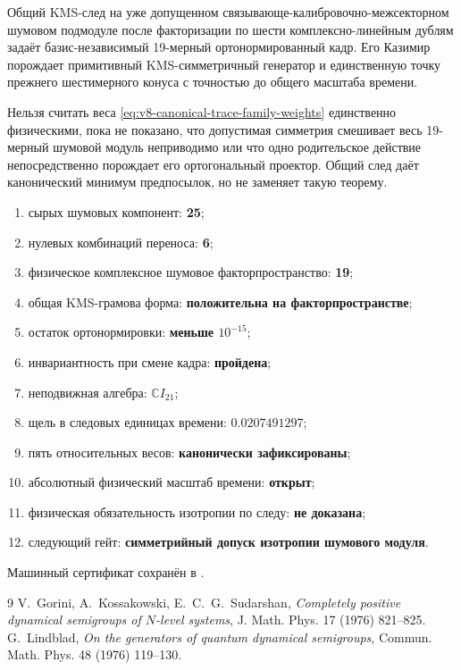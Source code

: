 \begin{theorem}
Общий KMS-след на уже допущенном связывающе-калибровочно-межсекторном шумовом подмодуле
после факторизации по шести комплексно-линейным дублям задаёт
базис-независимый 19-мерный ортонормированный кадр. Его Казимир порождает
примитивный KMS-симметричный генератор и единственную точку прежнего
шестимерного конуса с точностью до общего масштаба времени.
\end{theorem}

\begin{nogocriterion}
Нельзя считать веса \eqref{eq:v8-canonical-trace-family-weights}
единственно физическими, пока не показано, что допустимая симметрия смешивает
весь 19-мерный шумовой модуль неприводимо или что одно родительское действие
непосредственно порождает его ортогональный проектор. Общий след даёт
канонический минимум предпосылок, но не заменяет такую теорему.
\end{nogocriterion}

\begin{protocol}
\begin{enumerate}
 \item сырых шумовых компонент: \textbf{25};
 \item нулевых комбинаций переноса: \textbf{6};
 \item физическое комплексное шумовое факторпространство: \textbf{19};
 \item общая KMS-грамова форма: \textbf{положительна на факторпространстве};
 \item остаток ортонормировки: \textbf{меньше $10^{-15}$};
 \item инвариантность при смене кадра: \textbf{пройдена};
 \item неподвижная алгебра: \textbf{$\mathbb C I_{21}$};
 \item щель в следовых единицах времени: \textbf{$0.0207491297$};
 \item пять относительных весов: \textbf{канонически зафиксированы};
 \item абсолютный физический масштаб времени: \textbf{открыт};
 \item физическая обязательность изотропии по следу: \textbf{не доказана};
 \item следующий гейт: \textbf{симметрийный допуск изотропии шумового модуля}.
\end{enumerate}
\end{protocol}

Машинный сертификат сохранён в
.

\begin{thebibliography}{9}
V.~Gorini, A.~Kossakowski, E.~C.~G.~Sudarshan,
\emph{Completely positive dynamical semigroups of $N$-level systems},
J. Math. Phys. 17 (1976) 821--825.
G.~Lindblad,
\emph{On the generators of quantum dynamical semigroups},
Commun. Math. Phys. 48 (1976) 119--130.
\end{thebibliography}